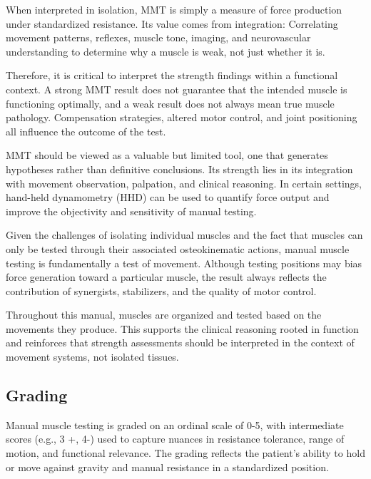 When interpreted in isolation, MMT is simply a measure of force production under standardized resistance. Its value comes from integration: Correlating movement patterns, reflexes, muscle tone, imaging, and neurovascular understanding to determine why a muscle is weak, not just whether it is.

Therefore, it is critical to interpret the strength findings within a functional context. A strong MMT result does not guarantee that the intended muscle is functioning optimally, and a weak result does not always mean true muscle pathology. Compensation strategies, altered motor control, and joint positioning all influence the outcome of the test.

MMT should be viewed as a valuable but limited tool, one that generates hypotheses rather than definitive conclusions. Its strength lies in its integration with movement observation, palpation, and clinical reasoning. In certain settings, hand-held dynamometry (HHD) can be used to quantify force output and improve the objectivity and sensitivity of manual testing.

\begin{tcolorbox}[colback=gray!5, colframe=black, title=Testing Muscles Through Movements]
Given the challenges of isolating individual muscles and the fact that muscles can only be tested through their associated osteokinematic actions, manual muscle testing is fundamentally a test of movement. Although testing positions may bias force generation toward a particular muscle, the result always reflects the contribution of synergists, stabilizers, and the quality of motor control.

Throughout this manual, muscles are organized and tested based on the movements they produce. This supports the clinical reasoning rooted in function and reinforces that strength assessments should be interpreted in the context of movement systems, not isolated tissues.
\end{tcolorbox}

\subsection*{Grading}
Manual muscle testing is graded on an ordinal scale of 0-5, with intermediate scores (e.g., 3 +, 4-) used to capture nuances in resistance tolerance, range of motion, and functional relevance. The grading reflects the patient's ability to hold or move against gravity and manual resistance in a standardized position.

